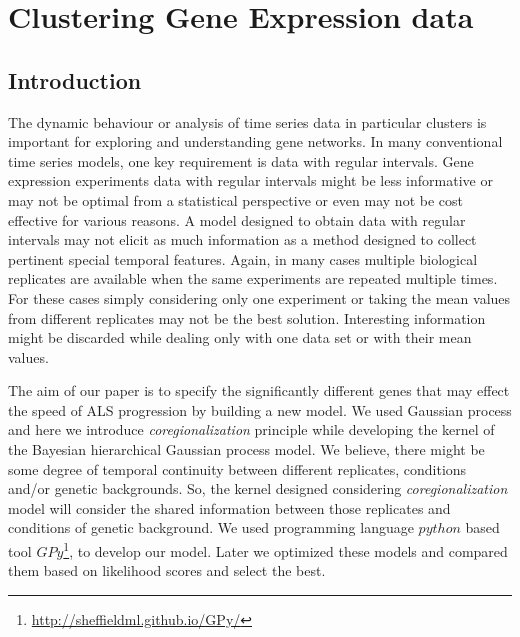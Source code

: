 
\chapter{Clustering Gene Expression data}

\ifpdf
    \graphicspath{{Chapter5/Figs/Raster/}{Chapter5/Figs/PDF/}{Chapter5/Figs/}}
\else
    \graphicspath{{Chapter5/Figs/Vector/}{Chapter5/Figs/}}
\fi

\section{Introduction}
The dynamic behaviour or analysis of time series data in particular clusters is important 
for exploring and understanding gene networks. In many conventional time series models, 
one key requirement is data with regular intervals. 
Gene expression experiments data with regular intervals might be less 
informative or may not be optimal from a statistical perspective or even may not be cost effective 
for various reasons. A model designed to obtain data with regular intervals may not elicit as much 
information as a method designed to collect pertinent special temporal features. Again, in many cases
multiple biological replicates are available when the same experiments are repeated multiple times.
For these cases simply considering only one experiment or taking the mean values from different
replicates may not be the best solution. Interesting information might be discarded while dealing
only with one data set or with their mean values.

The aim of our paper is to specify the significantly different genes that may effect the 
speed of ALS progression by building a new model. We used Gaussian process and 
here we introduce  \emph{coregionalization} principle while developing the kernel of the 
Bayesian hierarchical Gaussian process model.
We believe, there might be some degree of temporal continuity between different replicates, conditions
and/or genetic backgrounds. So, the kernel designed considering \emph{coregionalization} model will consider the 
shared information between those replicates and conditions of genetic background. We used programming language $python$ based tool 
$GPy$\footnote{\url{http://sheffieldml.github.io/GPy/}}, 
to develop our model. Later we optimized these models and compared them based on likelihood scores
and select the best.

